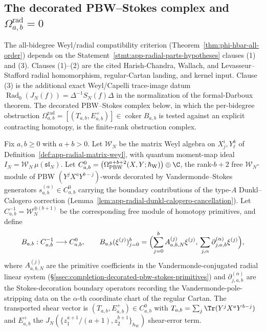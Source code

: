 \subsection{\texorpdfstring{The decorated PBW--Stokes complex and \(\Omega^{\mathrm{rad}}_{a,b}=0\)}{The decorated PBW-Stokes complex and Omega-rad-a,b = 0}}
\label{ssec:completion-decorated-pbw-stokes}

The all-bidegree Weyl/radial compatibility criterion
(Theorem~\ref{thm:phi-hbar-all-order}) depends on the
Statement~\ref{stmt:app-radial-parts-hypotheses} clauses (1)
and (3).  Clauses (1)--(2) are the cited Harish-Chandra, Wallach, and
Levasseur--Stafford radial homomorphism, regular-Cartan landing, and
kernel input.  Clause (3) is the additional exact Weyl/Capelli
trace-image datum
\(\operatorname{Rad}_0(J_N(f))=\Delta^{-1}S_N(f)\Delta\) in the
normalization of the formal-Darboux theorem.  The decorated PBW--Stokes
complex below, in which the per-bidegree obstruction
\(\Omega^{\mathrm{rad}}_{a,b}=[(T_{a,b},E^+_{a,b})]\in
\operatorname{coker}B_{a,b}\) is tested against an explicit
contracting homotopy, is the finite-rank obstruction complex.

\begin{defn}
\label{def:completion-pbw-stokes}
Fix \(a,b\ge 0\) with \(a+b>0\).  Let \(\mathcal W_N\) be the matrix
Weyl algebra on \(X^i_j,Y^k_\ell\) of
Definition~\ref{def:app-radial-matrix-weyl}, with quantum moment-map
ideal \(I_N=\mathcal W_N\,\mu(\mathfrak{sl}_N)\).  Let
\(C^0_{a,b}=\bigl(\Omega^{a+b+2}_{\mathrm{PBW}}(X,Y;\hbar_{\mathrm{W}})\bigr)
\oplus\C\), the rank-\(b+2\) free \(\mathcal W_N\)-module of PBW
\((Y^jX^aY^{b-j})\)-words decorated by Vandermonde--Stokes
generators
\(s^{(\alpha)}_{a,b}\in C^0_{a,b}\) carrying the boundary
contributions of the type-\(A\) Dunkl--Calogero
correction (Lemma~\ref{lem:app-radial-dunkl-calogero-cancellation}).
Let \(C^{-1}_{a,b}=\mathcal W_N^{\oplus(b+1)}\) be the corresponding
free module of homotopy primitives, and define
\[
  B_{a,b}:C^{-1}_{a,b}\longrightarrow C^0_{a,b},
  \qquad
  B_{a,b}(\xi^{(j)})_{j=0}^b
  =\Bigl(\sum_{j=0}^bA^{(j)}_{a,b,N}\xi^{(j)},\,
   \sum_{j,\alpha}\partial^{(\alpha)}_{j,a,b}\xi^{(j)}\Bigr),
\]
where \(A^{(j)}_{a,b,N}\) are the primitive coefficients in the
Vandermonde-conjugated radial linear system
(\S\ref{ssec:completion-decorated-pbw-stokes-primitives}) and
\(\partial^{(\alpha)}_{j,a,b}\) are the Stokes-decoration boundary
operators recording the
Vandermonde-pole-stripping data on the \(\alpha\)-th coordinate
chart of the regular Cartan.  The transported shear vector is
\((T_{a,b},E^+_{a,b})\in C^0_{a,b}\) with
\(T_{a,b}=\sum_j\Tr(Y^jX^aY^{b-j})\) and \(E^+_{a,b}\) the
\(J_N(\{z_1^{a+1}/(a+1),z_2^{b+1}\}_{\hbar_{\mathrm{W}}})\) shear-error term.
\end{defn}

